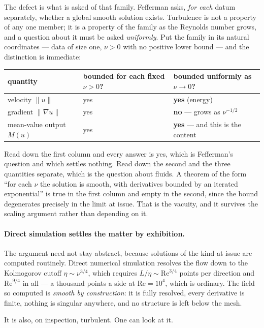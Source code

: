 \documentclass[11pt]{article}
\newcommand{\grad}{\nabla}
\begin{document}
The defect is what is asked of that family. Fefferman asks, \emph{for each} datum separately, whether
a global smooth solution exists. Turbulence is not a property of any one member; it is a property of
the family as the Reynolds number grows, and a question about it must be asked \emph{uniformly}. Put
the family in its natural coordinates --- data of size one, $\nu>0$ with no positive lower bound ---
and the distinction is immediate:
\begin{center}
\small
\begin{tabular}{@{}lll@{}}
\toprule
quantity & bounded for each fixed $\nu>0$? & bounded uniformly as $\nu\to0$?\\
\midrule
velocity $\|u\|$ & yes & \textbf{yes} (energy)\\
gradient $\|\grad u\|$ & yes & \textbf{no} --- grows as $\nu^{-1/2}$\\
mean-value output $M(u)$ & yes & \textbf{yes} --- and this is the content\\
\bottomrule
\end{tabular}
\end{center}
\noindent Read down the first column and every answer is yes, which is Fefferman's question and
which settles nothing. Read down the second and the three quantities separate, which is the question
about fluids. A theorem of the form ``for each $\nu$ the solution is smooth, with derivatives bounded
by an iterated exponential'' is true in the first column and empty in the second, since the bound
degenerates precisely in the limit at issue. That is the vacuity, and it survives the scaling
argument rather than depending on it.

\paragraph{Direct simulation settles the matter by exhibition.} The argument need not stay
abstract, because solutions of the kind at issue are computed routinely. Direct numerical simulation
resolves the flow down to the Kolmogorov cutoff $\eta\sim\nu^{3/4}$, which requires
$L/\eta\sim \mathrm{Re}^{3/4}$ points per direction and $\mathrm{Re}^{9/4}$ in all --- a thousand
points a side at $\mathrm{Re}=10^4$, which is ordinary. The field so computed is \emph{smooth by
construction}: it is fully resolved, every derivative is finite, nothing is singular anywhere, and
no structure is left below the mesh.

It is also, on inspection, turbulent. One can look at it.
\end{document}
